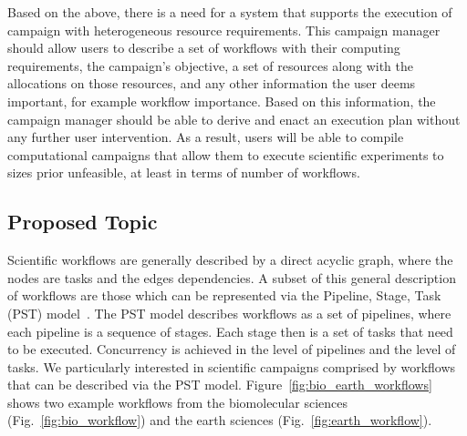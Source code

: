 Based on the above, there is a need for a system that supports the execution of campaign with heterogeneous resource requirements.
This campaign manager should allow users to describe a set of workflows with their computing requirements, the campaign's objective, a set of resources along with the allocations on those resources, and any other information the user deems important, for example workflow importance.
Based on this information, the campaign manager should be able to derive and enact an execution plan without any further user intervention.
As a result, users will be able to compile computational campaigns that allow them to execute scientific experiments to sizes prior unfeasible, at least in terms of number of workflows.


\subsection{Proposed Topic}
%
%

Scientific workflows are generally described by a direct acyclic graph, where the nodes are tasks and the edges dependencies.
A subset of this general description of workflows are those which can be represented via the Pipeline, Stage, Task (PST) model~\cite{balasubramanian2018harnessing}.
The PST model describes workflows as a set of pipelines, where each pipeline is a sequence of stages.
Each stage then is a set of tasks that need to be executed.
Concurrency is achieved in the level of pipelines and the level of tasks. 
We particularly interested in scientific campaigns comprised by workflows that can be described via the PST model.
Figure~\ref{fig:bio_earth_workflows} shows two example workflows from the biomolecular sciences (Fig.~\ref{fig:bio_workflow}) and the earth sciences (Fig.~\ref{fig:earth_workflow}). 

